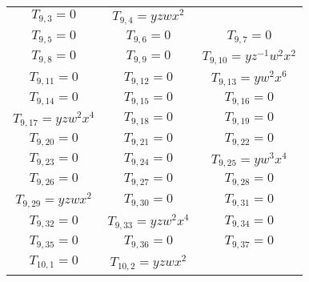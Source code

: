 \begin{longtable}{|c|c|c|}
$T_{9,3}= 0$&

$T_{9,4}= yzwx^2$\\

$T_{9,5}= 0$&

$T_{9,6}= 0$&

$T_{9,7}= 0$\\

$T_{9,8}= 0$&

$T_{9,9}= 0$&

$T_{9,10}= yz^{-1}w^2x^2$\\

$T_{9,11}= 0$&

$T_{9,12}= 0$&

$T_{9,13}= yw^2x^6$\\

$T_{9,14}= 0$&

$T_{9,15}= 0$&

$T_{9,16}= 0$\\

$T_{9,17}= yzw^2x^4$&

$T_{9,18}= 0$&

$T_{9,19}= 0$\\

$T_{9,20}= 0$&

$T_{9,21}= 0$&

$T_{9,22}= 0$\\

$T_{9,23}= 0$&

$T_{9,24}= 0$&

$T_{9,25}= yw^3x^4$\\

$T_{9,26}= 0$&

$T_{9,27}= 0$&

$T_{9,28}= 0$\\

$T_{9,29}= yzwx^2$&

$T_{9,30}= 0$&

$T_{9,31}= 0$\\

$T_{9,32}= 0$&

$T_{9,33}= yzw^2x^4$&

$T_{9,34}= 0$\\

$T_{9,35}= 0$&

$T_{9,36}= 0$&

$T_{9,37}= 0$\\

$T_{10,1}= 0$&

$T_{10,2}= yzwx^2$&


\end{longtable}

